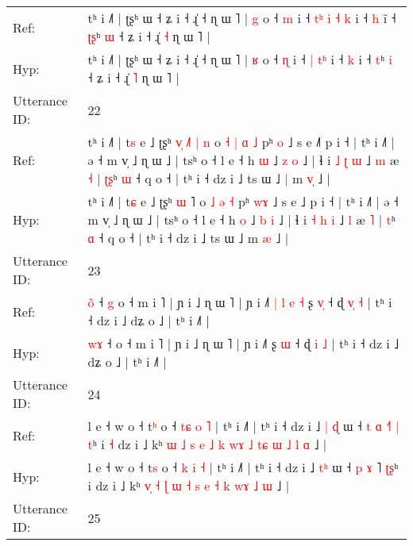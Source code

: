 \documentclass[10pt]{article}
\DeclareRobustCommand{\hl}[1]{{\textcolor{red}{#1}}}
\begin{document}
\begin{longtable}{ll}
Ref: & tʰ i ˩˥ | ʈʂʰ ɯ ˧ ʑ i ˧ ɻ̍ ˧ ɳ ɯ ˥ | \hl{g} o ˧ \hl{m} i ˧\hl{ }\hl{t}\hl{ʰ} \hl{i} \hl{˧}\hl{ }\hl{k} i ˧ \hl{h} i\hl{̃} ˧ \hl{ʈ}\hl{ʂ}ʰ \hl{ɯ} ˧ ʑ i ˧ ɻ̍ \hl{˧} ɳ ɯ ˥ |
 \\
Hyp: & tʰ i ˩˥ | ʈʂʰ ɯ ˧ ʑ i ˧ ɻ̍ ˧ ɳ ɯ ˥ | \hl{ʁ} o ˧ \hl{ɳ} i ˧\hl{}\hl{}\hl{} \hl{|} \hl{}\hl{t}\hl{ʰ} i ˧ \hl{k} i\hl{} ˧ \hl{}\hl{t}ʰ \hl{i} ˧ ʑ i ˧ ɻ̍ \hl{˥} ɳ ɯ ˥ |
 \\
\midrule
Utterance ID: & 22 \\
Ref: & tʰ i ˩˥ | t\hl{s} e ˩ ʈʂʰ \hl{v}\hl{̩} \hl{˩}˥\hl{ }\hl{|}\hl{ }\hl{n} o\hl{ }\hl{˧} \hl{|} \hl{ɑ} \hl{˩} pʰ \hl{}\hl{o} ˩ s e ˩\hl{˥} p i ˧ | tʰ i ˩˥ | ə ˧ m v̩ ˩ ɳ ɯ ˩ | tsʰ o ˧ l e ˧ h \hl{ɯ} ˩ \hl{z} \hl{o} ˩ | ɬ i \hl{˩} \hl{ʈ} \hl{ɯ} ˩ \hl{m} æ \hl{˧} | \hl{ʈ}\hl{ʂ}ʰ \hl{ɯ} ˧ q o ˧ | tʰ i ˧ dz i ˩ ts ɯ ˩\hl{ }\hl{|} m \hl{v}\hl{̩} ˩ |
 \\
Hyp: & tʰ i ˩˥ | t\hl{ɕ} e ˩ ʈʂʰ \hl{}\hl{ɯ} \hl{}˥\hl{}\hl{}\hl{}\hl{} o\hl{}\hl{} \hl{˩} \hl{ə} \hl{˧} pʰ \hl{w}\hl{ɤ} ˩ s e ˩\hl{} p i ˧ | tʰ i ˩˥ | ə ˧ m v̩ ˩ ɳ ɯ ˩ | tsʰ o ˧ l e ˧ h \hl{o} ˩ \hl{b} \hl{i} ˩ | ɬ i \hl{˧} \hl{h} \hl{i} ˩ \hl{l} æ \hl{˥} | \hl{}\hl{t}ʰ \hl{ɑ} ˧ q o ˧ | tʰ i ˧ dz i ˩ ts ɯ ˩\hl{}\hl{} m \hl{}\hl{æ} ˩ |
 \\
\midrule
Utterance ID: & 23 \\
Ref: & \hl{o}\hl{̃} ˧\hl{ }\hl{g} o ˧ m i ˥ | ɲ i ˩ ɳ ɯ ˥ | ɲ i ˩˥\hl{ }\hl{|}\hl{ }\hl{l}\hl{ }\hl{e}\hl{ }\hl{˧} ʂ \hl{v}\hl{̩} ˧ ɖ \hl{v}\hl{̩} \hl{˧} | tʰ i ˧ dz i ˩ dʑ o ˩ | tʰ i ˩˥ |
 \\
Hyp: & \hl{w}\hl{ɤ} ˧\hl{}\hl{} o ˧ m i ˥ | ɲ i ˩ ɳ ɯ ˥ | ɲ i ˩˥\hl{}\hl{}\hl{}\hl{}\hl{}\hl{}\hl{}\hl{} ʂ \hl{}\hl{ɯ} ˧ ɖ \hl{}\hl{i} \hl{˩} | tʰ i ˧ dz i ˩ dʑ o ˩ | tʰ i ˩˥ |
 \\
\midrule
Utterance ID: & 24 \\
Ref: & l e ˧ w o ˧ t\hl{ʰ} o ˧ \hl{t}\hl{ɕ} \hl{o} \hl{˥} | tʰ i ˩˥ | tʰ i ˧ dz i ˩ \hl{|}\hl{ }\hl{ɖ} ɯ ˧ \hl{t} \hl{ɑ} \hl{˧}˥ \hl{|}\hl{ }\hl{t}ʰ i\hl{ }\hl{˧} dz i ˩ kʰ \hl{}\hl{ɯ} \hl{˩} \hl{s} \hl{e} \hl{˩} \hl{k} \hl{w}\hl{ɤ} \hl{˩} \hl{t}\hl{ɕ} \hl{ɯ}\hl{ }\hl{˩} \hl{l} \hl{ɑ} ˩ |
 \\
Hyp: & l e ˧ w o ˧ t\hl{s} o ˧ \hl{}\hl{k} \hl{i} \hl{˧} | tʰ i ˩˥ | tʰ i ˧ dz i ˩ \hl{}\hl{t}\hl{ʰ} ɯ ˧ \hl{p} \hl{ɤ} \hl{}˥ \hl{}\hl{ʈ}\hl{ʂ}ʰ i\hl{}\hl{} dz i ˩ kʰ \hl{v}\hl{̩} \hl{˧} \hl{ɭ} \hl{ɯ} \hl{˧} \hl{s} \hl{}\hl{e} \hl{˧} \hl{}\hl{k} \hl{}\hl{w}\hl{ɤ} \hl{˩} \hl{ɯ} ˩ |
 \\
\midrule
Utterance ID: & 25 \\

\end{longtable}
\end{document}
